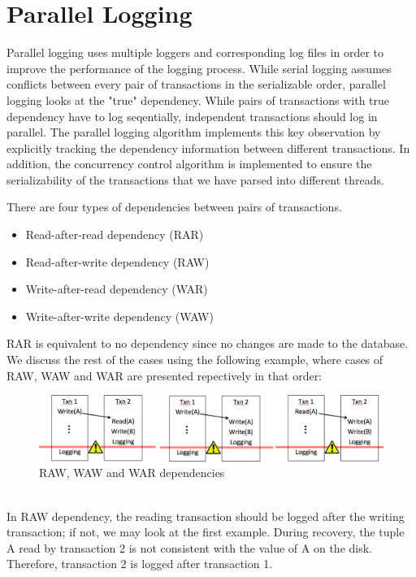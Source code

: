 \section{Parallel Logging}
Parallel logging uses multiple loggers and corresponding log files in order to improve the performance of the logging process. While serial logging assumes conflicts between every pair of transactions in the serializable order, parallel logging looks at the "true" dependency. While pairs of transactions with true dependency have to log seqentially, independent transactions should log in parallel. The parallel logging algorithm implements this key observation by explicitly tracking the dependency information between different transactions. In addition, the concurrency control algorithm is implemented to ensure the serializability of the transactions that we have parsed into different threads. \par


There are four types of dependencies between pairs of transactions.
\begin{itemize}
\item Read-after-read dependency (RAR)
\item Read-after-write dependency (RAW)
\item Write-after-read dependency (WAR)
\item Write-after-write dependency (WAW)
\end{itemize}
RAR is equivalent to no dependency since no changes are made to the database. We discuss the rest of the cases using the following example, where cases of RAW, WAW and WAR are presented repectively in that order:
\begin{figure}[!h]
\caption{RAW, WAW and WAR dependencies}
\includegraphics[width=\textwidth]{Dependencies.jpg}
\end{figure}\\
In RAW dependency, the reading transaction should be logged after the writing transaction; if not, we may look at the first example. During recovery, the tuple A read by transaction 2 is not consistent with the value of A on the disk. Therefore, transaction 2 is logged after transaction 1.

